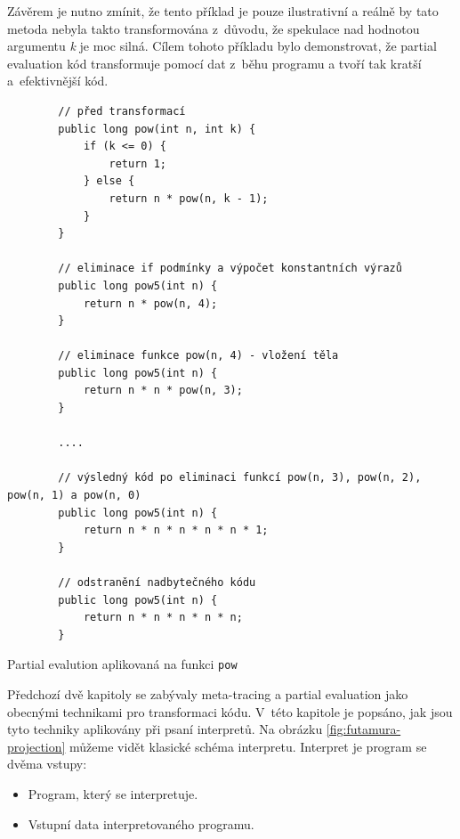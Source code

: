\documentclass[
  master,
  biblatex,
  figures=true,
  theorems,
  sourcecodes,
  glossaries,
  index
]{kidiplom}
\begin{document}
Závěrem je nutno zmínit, že tento příklad je pouze ilustrativní a reálně by tato metoda nebyla takto transformována z~důvodu, že spekulace nad hodnotou argumentu \textit{k} je moc silná. Cílem tohoto příkladu bylo demonstrovat, že partial evaluation kód transformuje pomocí dat z~běhu programu a tvoří tak kratší a~efektivnější kód.  

\begin{listing} 
    \begin{verbatim}
        // před transformací
        public long pow(int n, int k) {
            if (k <= 0) {
                return 1;
            } else {
                return n * pow(n, k - 1);
            }
        }
        
        // eliminace if podmínky a výpočet konstantních výrazů
        public long pow5(int n) {
            return n * pow(n, 4);
        }
    
        // eliminace funkce pow(n, 4) - vložení těla 
        public long pow5(int n) {
            return n * n * pow(n, 3);
        }
    
        ....
    
        // výsledný kód po eliminaci funkcí pow(n, 3), pow(n, 2), pow(n, 1) a pow(n, 0)
        public long pow5(int n) {
            return n * n * n * n * n * 1;
        }
        
        // odstranění nadbytečného kódu
        public long pow5(int n) {
            return n * n * n * n * n;
        }
    \end{verbatim}
    \caption{Partial evalution aplikovaná na funkci \texttt{pow}}
    \label{partial-evaluation-example}
\end{listing}

\clearpage

Předchozí dvě kapitoly se zabývaly meta-tracing a partial evaluation jako obecnými technikami pro transformaci kódu. V~této kapitole je popsáno, jak jsou tyto techniky aplikovány při psaní interpretů. Na obrázku \ref{fig:futamura-projection} můžeme vidět klasické schéma interpretu. Interpret je program se dvěma vstupy: 

\begin{itemize}
    \item Program, který se interpretuje. 
    \item Vstupní data interpretovaného programu.
\end{itemize}
\end{document}
